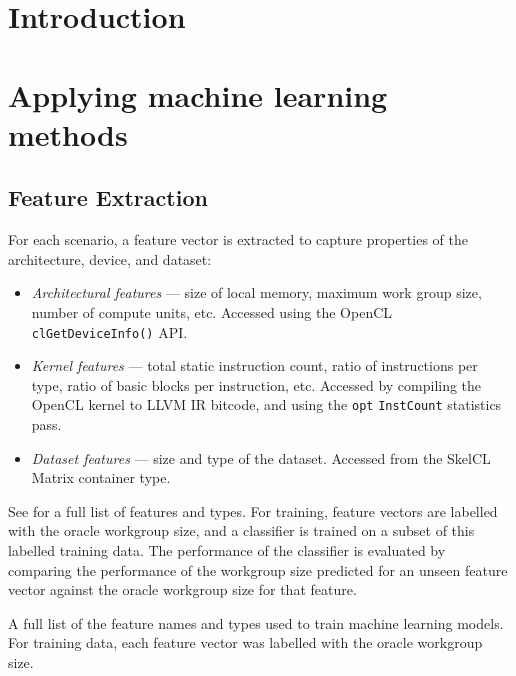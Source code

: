 \section{Introduction}


\section{Applying machine learning methods}

\subsection{Feature Extraction}

For each scenario, a feature vector is extracted to capture properties
of the architecture, device, and dataset:

\begin{itemize}
\item \emph{Architectural features} --- size of local memory, maximum
  work group size, number of compute units, etc. Accessed using the
  OpenCL \texttt{clGetDeviceInfo()} API.
\item \emph{Kernel features} --- total static instruction count, ratio
  of instructions per type, ratio of basic blocks per instruction,
  etc. Accessed by compiling the OpenCL kernel to LLVM IR bitcode, and
  using the \texttt{opt} \texttt{InstCount} statistics pass.
\item \emph{Dataset features} --- size and type of the
  dataset. Accessed from the SkelCL Matrix container type.
\end{itemize}

See  for a full list of features and types. For
training, feature vectors are labelled with the oracle workgroup size,
and a classifier is trained on a subset of this labelled training
data. The performance of the classifier is evaluated by comparing the
performance of the workgroup size predicted for an unseen feature
vector against the oracle workgroup size for that feature.

A full list of the feature names and types used to train machine
learning models. For training data, each feature vector was labelled
with the oracle workgroup size.

